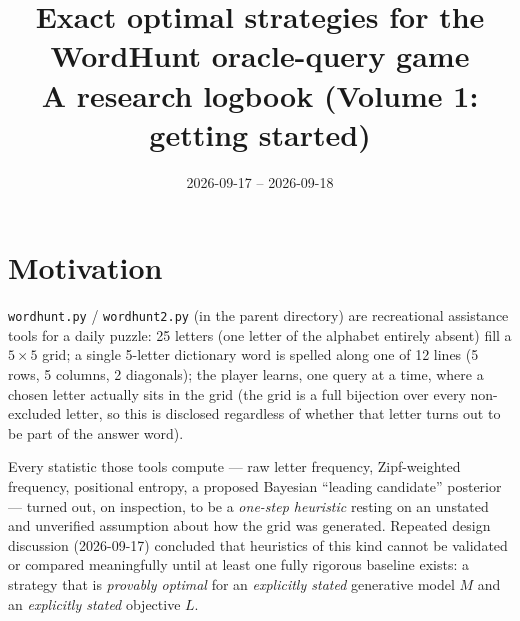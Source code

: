 \documentclass[11pt]{article}
\title{Exact optimal strategies for the WordHunt oracle-query game\\
\large A research logbook (Volume 1: getting started)}
\author{}
\date{2026-09-17 -- 2026-09-18}
\begin{document}
\maketitle

\begin{center}
\end{center}

\section{Motivation}

\texttt{wordhunt.py} / \texttt{wordhunt2.py} (in the parent directory) are
recreational assistance tools for a daily puzzle: 25 letters (one letter of
the alphabet entirely absent) fill a $5\times5$ grid; a single 5-letter
dictionary word is spelled along one of 12 lines (5 rows, 5 columns, 2
diagonals); the player learns, one query at a time, where a chosen letter
actually sits in the grid (the grid is a full bijection over every
non-excluded letter, so this is disclosed regardless of whether that
letter turns out to be part of the answer word).

Every statistic those tools compute --- raw letter frequency, Zipf-weighted
frequency, positional entropy, a proposed Bayesian ``leading candidate''
posterior --- turned out, on inspection, to be a \emph{one-step heuristic}
resting on an unstated and unverified assumption about how the grid was
generated. Repeated design discussion (2026-09-17) concluded that heuristics
of this kind cannot be validated or compared meaningfully until at least one
fully rigorous baseline exists: a strategy that is \emph{provably optimal}
for an \emph{explicitly stated} generative model $M$ and an \emph{explicitly
stated} objective $L$.
\end{document}
